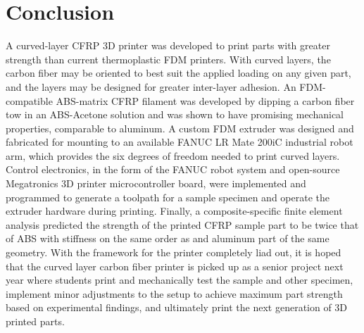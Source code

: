 \section{Conclusion}

\indent

A curved-layer CFRP 3D printer was developed to print parts with greater strength than current thermoplastic FDM printers. With curved layers, the carbon fiber may be oriented to best suit the applied loading on any given part, and the layers may be designed for greater inter-layer adhesion. An FDM-compatible ABS-matrix CFRP filament was developed by dipping a carbon fiber tow in an ABS-Acetone solution and was shown to have promising mechanical properties, comparable to aluminum. A custom FDM extruder was designed and fabricated for mounting to an available FANUC LR Mate 200iC industrial robot arm, which provides the six degrees of freedom needed to print curved layers. Control electronics, in the form of the FANUC robot system and open-source Megatronics 3D printer microcontroller board, were implemented and programmed to generate a toolpath for a sample specimen and operate the extruder hardware during printing. Finally, a composite-specific finite element analysis predicted the strength of the printed CFRP sample part to be twice that of ABS with stiffness on the same order as and aluminum part of the same geometry. With the framework for the printer completely liad out, it is hoped that the curved layer carbon fiber printer is picked up as a senior project next year where students print and mechanically test the sample and other specimen, implement minor adjustments to the setup to achieve maximum part strength based on experimental findings, and ultimately print the next generation of 3D printed parts.\\


